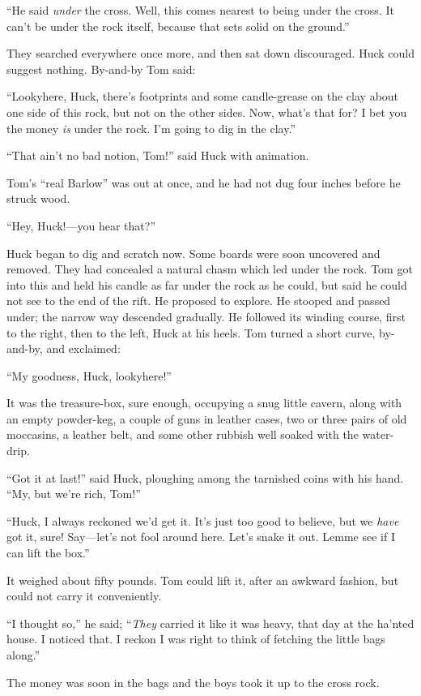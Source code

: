 \documentclass{book}
\begin{document}
“He said \emph{under} the cross. Well, this comes nearest to being under the cross. It can’t be under the rock itself, because that sets solid on the ground.”

They searched everywhere once more, and then sat down discouraged. Huck could suggest nothing. By-and-by Tom said:

“Lookyhere, Huck, there’s footprints and some candle-grease on the clay about one side of this rock, but not on the other sides. Now, what’s that for? I bet you the money \emph{is} under the rock. I’m going to dig in the clay.”

“That ain’t no bad notion, Tom!” said Huck with animation.

Tom’s “real Barlow” was out at once, and he had not dug four inches before he struck wood.

“Hey, Huck!—you hear that?”

Huck began to dig and scratch now. Some boards were soon uncovered and removed. They had concealed a natural chasm which led under the rock. Tom got into this and held his candle as far under the rock as he could, but said he could not see to the end of the rift. He proposed to explore. He stooped and passed under; the narrow way descended gradually. He followed its winding course, first to the right, then to the left, Huck at his heels. Tom turned a short curve, by-and-by, and exclaimed:

“My goodness, Huck, lookyhere!”

It was the treasure-box, sure enough, occupying a snug little cavern, along with an empty powder-keg, a couple of guns in leather cases, two or three pairs of old moccasins, a leather belt, and some other rubbish well soaked with the water-drip.

“Got it at last!” said Huck, ploughing among the tarnished coins with his hand. “My, but we’re rich, Tom!”

“Huck, I always reckoned we’d get it. It’s just too good to believe, but we \emph{have} got it, sure! Say—let’s not fool around here. Let’s snake it out. Lemme see if I can lift the box.”

It weighed about fifty pounds. Tom could lift it, after an awkward fashion, but could not carry it conveniently.

“I thought so,” he said; “\emph{They} carried it like it was heavy, that day at the ha’nted house. I noticed that. I reckon I was right to think of fetching the little bags along.”

The money was soon in the bags and the boys took it up to the cross rock.
\end{document}
